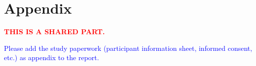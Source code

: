 \documentclass[conference]{IEEEtran}
\begin{document}
\section{Appendix}

\textcolor{red}{\textbf{THIS IS A SHARED PART.}}

\textcolor{blue}{Please add the study paperwork (participant information sheet, informed consent, etc.) as 
appendix to the report.
}




\end{document}
